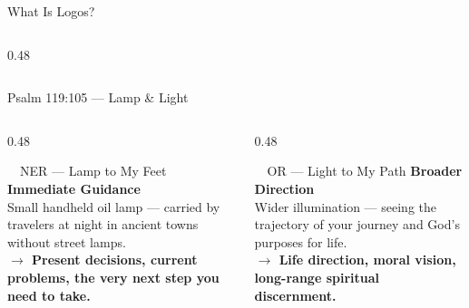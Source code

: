 \documentclass[aspectratio=169,12pt]{beamer}
\begin{document}
\begin{frame}{What Is Logos?}
\begin{columns}[T]
\begin{column}{0.48\textwidth}
\end{column}
\end{columns}

\end{frame}

\begin{frame}{Psalm 119:105 --- Lamp \& Light}

\begin{center}
\end{center}

\vspace{0.2cm}

\begin{columns}[T]
\begin{column}{0.48\textwidth}
\begin{block}{~~NER --- Lamp to My Feet}
\vspace{2pt}
\textbf{\color{teal}Immediate Guidance}\\[4pt]
{\small Small handheld oil lamp --- carried by travelers at night in ancient towns without street lamps.}\\[6pt]
{\small\bfseries\color{navy} $\rightarrow$ Present decisions, current problems, the very next step you need to take.}
\end{block}
\end{column}
\begin{column}{0.48\textwidth}
\begin{exampleblock}{~~OR --- Light to My Path}
\vspace{2pt}
\textbf{\color{gold}Broader Direction}\\[4pt]
{\small Wider illumination --- seeing the trajectory of your journey and God's purposes for life.}\\[6pt]
{\small\bfseries\color{navy} $\rightarrow$ Life direction, moral vision, long-range spiritual discernment.}
\end{exampleblock}
\end{column}
\end{columns}

\end{frame}
\end{document}
